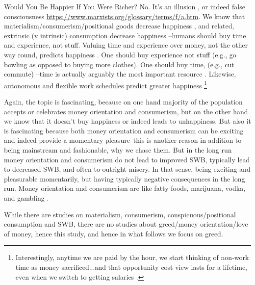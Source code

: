 \documentclass[10pt, letterpaper]{article}
\begin{document}
\begin{spacing}{1.8}
Would You Be Happier If You Were Richer? No. It's an illusion \citep{kahneman06c}, or indeed
 false consciousness \url{https://www.marxists.org/glossary/terms/f/a.htm}.
We know that materialism/consumerism/positional goods decrease happiness 
\cite{kasser16,dittmar14,brown05,kasser13,schmuck00,kasser93,leonard10}, and related,
extrinsic (v intrinsic) consumption decrease happiness 
\citep{ryan00,ryan99,morrison17}--humans should buy time and experience, not stuff. 
Valuing time and experience over money, not the other way round, predicts happiness \citep{whillans2019valuing}.
One should buy experience not stuff (e.g., go bowling as opposed to buying more
clothes)\citep{putnam01,kasser16,dittmar14}. One should buy time, (e.g., cut
commute)  %
--time is actually arguably
the most important resource \citep{whillans17}. Likewise, autonomous and
flexible work schedules predict greater happiness \citep{gssLonnie18,aokLead17,farber16sep15,golden06w,golden13}\footnote{Interestingly, anytime we are paid by the hour, we start thinking of non-work time as money sacrificed...and that opportunity cost view lasts for  a lifetime, even when we switch to getting salaries \citep{devoe19}.}





Again, the topic is fascinating, because on one hand majority of the population accepts
or celebrates money orientation and consumerism, but on the other hand we know
that it doesn't buy happiness or indeed leads to unhappiness.
%
But also it is fascinating because both money orientation and consumerism can be
exciting and indeed provide a momentary pleasure--this is another reason in
addition to being mainstream and fashionable, why we chase them.
But in the long run money orientation and consumerism do not lead to improved
SWB, typically lead to decreased SWB, and often to outright misery. In that
sense, being exciting and pleasurable momentarily, but having typically negative
consequences in the long run. Money orientation and consumerism are like
 fatty foods, marijuana, vodka, and gambling \citep{linden11}.

While there are studies on  materialism, consumerism,
conspicuous/positional consumption and SWB, there are no studies about
greed/money orientation/love of money, hence this study, and hence in what
follows we focus on greed.


\end{spacing}
\end{document}
